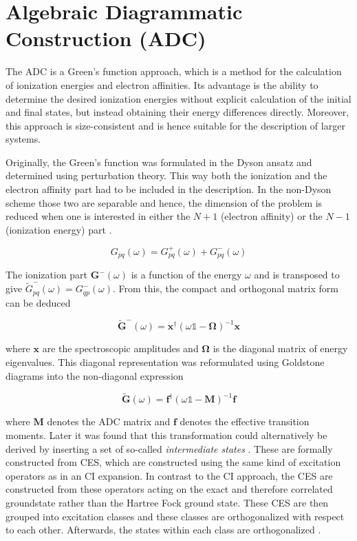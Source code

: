 \chapter{Algebraic Diagrammatic Construction (ADC)}
\label{chapter:adc}

The \acl{ADC} is a Green's function approach, which is a method for the
calculation of ionization
energies and electron affinities.
Its advantage is the ability to determine the desired ionization energies
without explicit calculation of the initial and final states, but instead
obtaining their energy differences directly.
Moreover, this approach is size-consistent and is hence
suitable for the description of larger systems. \cite{Mertins96_1}

Originally, the Green's function was formulated in the Dyson ansatz and
determined using perturbation theory. This way both the ionization and the
electron affinity part had to be included in the description. In the non-Dyson
scheme those two are separable and hence, the dimension of the problem is reduced
when one is interested in either the $N+1$ (electron affinity)
or the $N-1$ (ionization energy) part \cite{Schirmer98}.

\begin{equation}
 G_{pq}(\omega) = G^+_{pq}(\omega) + G^-_{pq}(\omega)
\end{equation}

The ionization part $\mathbf{G^-}(\omega)$ is a function of the energy
$\omega$ and is transposed to give
$\tilde{G}^-_{pq}(\omega) = G^-_{qp}(\omega)$. From this, the compact 
and orthogonal matrix
form can be deduced

\begin{equation}\label{matrixspec}
\mathbf{\tilde{G}}^-(\omega) = \mathbf{x}^\dagger
                               (\omega\mathds{1}-\mathbf{\Omega})^{-1}\mathbf{x}
\end{equation}

where $\mathbf{x}$ are the spectroscopic amplitudes and $\mathbf{\Omega}$ is
the diagonal matrix of energy eigenvalues.
This diagonal representation was reformulated using Goldstone diagrams
into the non-diagonal expression

\begin{equation}\label{isradc}
\mathbf{\tilde{G}}(\omega) = \mathbf{f}^\dagger(\omega\mathds{1}-\mathbf{M})^{-1}\mathbf{f}
\end{equation}

where $\mathbf{M}$ denotes the \ac{ADC} matrix and $\mathbf{f}$ denotes
the effective transition moments.
Later it was found that this transformation could alternatively be
derived by inserting a set of so-called \emph{intermediate states}
\cite{Schirmer91}.
These are formally constructed from \ac{CES}, which are constructed
using the same kind of excitation operators as in an \ac{CI} expansion.
In contrast to the \ac{CI} approach, the \ac{CES}
are constructed from these operators
acting on the exact and therefore correlated groundstate rather than the
Hartree Fock ground state. These \ac{CES} are then
grouped into excitation classes
and these classes are orthogonalized with respect to each other. Afterwards,  
the states within each class are orthogonalized \cite{Mertins96_1}.

